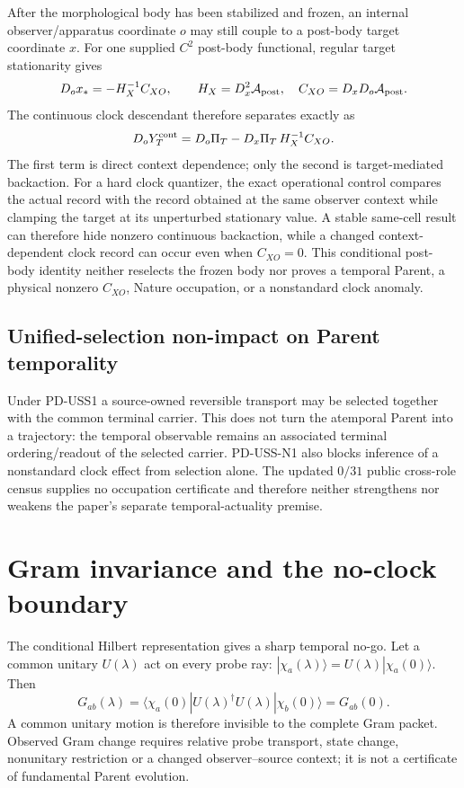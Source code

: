 \documentclass[11pt]{article}
\begin{document}
After the morphological body has been stabilized and frozen, an internal
observer/apparatus coordinate $o$ may still couple to a post-body target
coordinate $x$. For one supplied $C^2$ post-body functional, regular target
stationarity gives
\begin{equation}
 D_o x_*=-H_X^{-1}C_{XO},\qquad
 H_X=D_x^2\mathcal A_{\rm post},\quad
 C_{XO}=D_xD_o\mathcal A_{\rm post}.
 \label{eq:paperv-generalized-backaction}
\end{equation}
The continuous clock descendant therefore separates exactly as
\begin{equation}
 D_oY_T^{\rm cont}
 =D_o\Pi_T-D_x\Pi_T\,H_X^{-1}C_{XO}.
 \label{eq:paperv-clock-backaction-split}
\end{equation}
The first term is direct context dependence; only the second is
target-mediated backaction. For a hard clock quantizer, the exact operational
control compares the actual record with the record obtained at the same
observer context while clamping the target at its unperturbed stationary
value. A stable same-cell result can therefore hide nonzero continuous
backaction, while a changed context-dependent clock record can occur even when
$C_{XO}=0$. This conditional post-body identity neither reselects the frozen
body nor proves a temporal Parent, a physical nonzero $C_{XO}$, Nature
occupation, or a nonstandard clock anomaly.

\subsection*{Unified-selection non-impact on Parent temporality}

Under PD-USS1 a source-owned reversible transport may be selected together
with the common terminal carrier. This does not turn the atemporal Parent
into a trajectory: the temporal observable remains an associated terminal
ordering/readout of the selected carrier. PD-USS-N1 also blocks inference of
a nonstandard clock effect from selection alone. The updated $0/31$ public
cross-role census supplies no occupation certificate and therefore neither
strengthens nor weakens the paper's separate temporal-actuality premise.

\section{Gram invariance and the no-clock boundary}

The conditional Hilbert representation gives a sharp temporal no-go.  Let a
common unitary $U(\lambda)$ act on every probe ray:
$|\chi_a(\lambda)\rangle=U(\lambda)|\chi_a(0)\rangle$.  Then
\begin{equation}
 G_{ab}(\lambda)
 =\langle\chi_a(0)|U(\lambda)^\dagger U(\lambda)|\chi_b(0)\rangle
 =G_{ab}(0).
 \label{eq:paperV-common-unitary-gram}
\end{equation}
A common unitary motion is therefore invisible to the complete Gram packet.
Observed Gram change requires relative probe transport, state change,
nonunitary restriction or a changed observer--source context; it is not a
certificate of fundamental Parent evolution.
\end{document}
